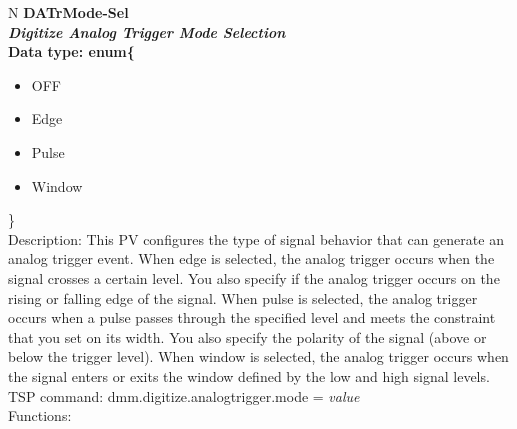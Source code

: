 \documentclass[openany]{article}
\begin{document}
		\begin{tabular}{N}
			\hline
			\bfseries DATrMode-Sel\label{pv:datrmode-sel} \\ \hline
			\emph{Digitize Analog Trigger Mode Selection} \\
			Data type: enum\{\begin{itemize}[noitemsep]
				\small
				\item[] OFF
				\item[] Edge
				\item[] Pulse
				\item[] Window
			\end{itemize}\} \\
			Description: This PV configures the type of signal behavior that can generate an analog trigger event. When edge is selected, the analog trigger occurs when the signal crosses a certain level. You also specify if the analog trigger occurs on the rising or falling edge of the signal. When pulse is selected, the analog trigger occurs when a pulse passes through the specified level and meets the constraint that you set on its width. You also specify the polarity of the signal (above or below the trigger level). When window is selected, the analog trigger occurs when the signal enters or exits the window defined by the low and high signal levels.\\
			TSP command: dmm.digitize.analogtrigger.mode = \emph{value} \\
			Functions: \\
			\arrayrulecolor{\FuncTableBorderColor}

		\end{tabular}
\end{document}
